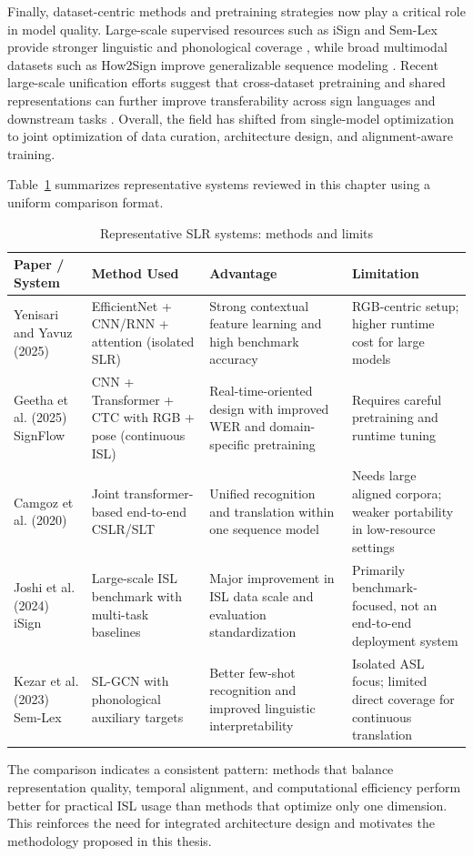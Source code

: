 Finally, dataset-centric methods and pretraining strategies now play a critical role in model quality. Large-scale supervised resources such as iSign and Sem-Lex provide stronger linguistic and phonological coverage \cite{joshi2024isign,kezar2023semlex}, while broad multimodal datasets such as How2Sign improve generalizable sequence modeling \cite{duarte2021how2sign}. Recent large-scale unification efforts suggest that cross-dataset pretraining and shared representations can further improve transferability across sign languages and downstream tasks \cite{li2025unisign}. Overall, the field has shifted from single-model optimization to joint optimization of data curation, architecture design, and alignment-aware training.

Table~\ref{tab:paper-method-comparison} summarizes representative systems reviewed in this chapter using a uniform comparison format.

\begin{table}[htbp]
\centering
\renewcommand{\arraystretch}{1.2}
\setlength{\tabcolsep}{4pt}
\begin{tabularx}{\textwidth}{|p{3.1cm}|p{3.3cm}|X|X|}
\hline
\textbf{Paper / System} & \textbf{Method Used} & \textbf{Advantage} & \textbf{Limitation} \\ \hline
Yenisari and Yavuz (2025) \cite{yenisari2025deep} & EfficientNet + CNN/RNN + attention (isolated SLR) & Strong contextual feature learning and high benchmark accuracy & RGB-centric setup; higher runtime cost for large models \\ \hline
Geetha et al. (2025) SignFlow \cite{geetha2025toward} & CNN + Transformer + CTC with RGB + pose (continuous ISL) & Real-time-oriented design with improved WER and domain-specific pretraining & Requires careful pretraining and runtime tuning \\ \hline
Camgoz et al. (2020) \cite{camgoz2020transformers} & Joint transformer-based end-to-end CSLR/SLT & Unified recognition and translation within one sequence model & Needs large aligned corpora; weaker portability in low-resource settings \\ \hline
Joshi et al. (2024) iSign \cite{joshi2024isign} & Large-scale ISL benchmark with multi-task baselines & Major improvement in ISL data scale and evaluation standardization & Primarily benchmark-focused, not an end-to-end deployment system \\ \hline
Kezar et al. (2023) Sem-Lex \cite{kezar2023semlex} & SL-GCN with phonological auxiliary targets & Better few-shot recognition and improved linguistic interpretability & Isolated ASL focus; limited direct coverage for continuous translation \\ \hline
\end{tabularx}
\caption{Representative SLR systems: methods and limits}
\label{tab:paper-method-comparison}
\end{table}

The comparison indicates a consistent pattern: methods that balance representation quality, temporal alignment, and computational efficiency perform better for practical ISL usage than methods that optimize only one dimension. This reinforces the need for integrated architecture design and motivates the methodology proposed in this thesis.
